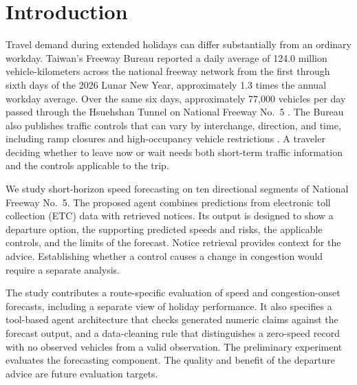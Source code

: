 \section{Introduction}
Travel demand during extended holidays can differ substantially from an ordinary workday. Taiwan's Freeway Bureau reported a daily average of 124.0 million vehicle-kilometers across the national freeway network from the first through sixth days of the 2026 Lunar New Year, approximately 1.3 times the annual workday average. Over the same six days, approximately 77,000 vehicles per day passed through the Hsuehshan Tunnel on National Freeway No.~5 \cite{fwb2026holiday}. The Bureau also publishes traffic controls that can vary by interchange, direction, and time, including ramp closures and high-occupancy vehicle restrictions \cite{fwb2026controls}. A traveler deciding whether to leave now or wait needs both short-term traffic information and the controls applicable to the trip.

We study short-horizon speed forecasting on ten directional segments of National Freeway No.~5. The proposed agent combines predictions from electronic toll collection (ETC) data with retrieved notices. Its output is designed to show a departure option, the supporting predicted speeds and risks, the applicable controls, and the limits of the forecast. Notice retrieval provides context for the advice. Establishing whether a control causes a change in congestion would require a separate analysis.

The study contributes a route-specific evaluation of speed and congestion-onset forecasts, including a separate view of holiday performance. It also specifies a tool-based agent architecture that checks generated numeric claims against the forecast output, and a data-cleaning rule that distinguishes a zero-speed record with no observed vehicles from a valid observation. The preliminary experiment evaluates the forecasting component. The quality and benefit of the departure advice are future evaluation targets.

